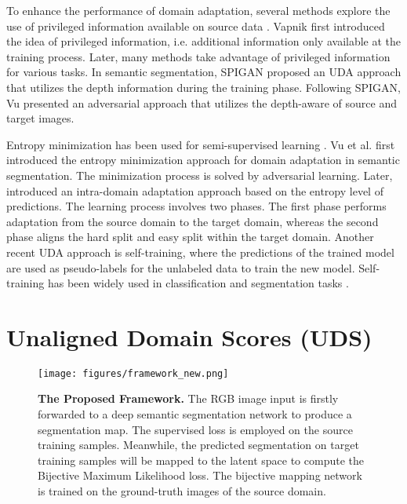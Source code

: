 \documentclass[10pt,twocolumn,letterpaper]{article}
\begin{document}
To enhance the performance of domain adaptation, several methods explore the use of privileged information available on source data \cite{chen2014recognizing, li2014exploiting, sarafianos2017adaptive}. Vapnik \etal \cite{vapnik2009new} first introduced the idea of privileged information, i.e. additional information only available at the training process. Later, many methods \cite{hoffman2016learning, lopez2015unifying, mordan2018revisiting, Sharmanska_2013_ICCV} take advantage of privileged information for various tasks. In semantic segmentation, SPIGAN \cite{lee2018spigan} proposed an UDA approach that utilizes the depth information during the training phase. Following SPIGAN,  Vu \etal\cite{vu2019dada} presented an adversarial approach that utilizes the depth-aware of source and target images.



Entropy minimization has been used for semi-supervised learning \cite{grandvalet2005semi, springenberg2015unsupervised}. Vu et al. \cite{vu2019advent} first introduced the entropy minimization approach for domain adaptation in semantic segmentation. The minimization process is solved by adversarial learning. Later, \cite{pan2020unsupervised} introduced an intra-domain adaptation approach based on the entropy level of predictions. The learning process involves two phases. The first phase performs adaptation from the source domain to the target domain, whereas the second phase aligns the hard split and easy split within the target domain.
Another recent UDA approach is self-training, where 
the predictions of the trained model are used as pseudo-labels for the unlabeled data to train the new model. Self-training has been widely used in classification \cite{NEURIPS2019_bf25356f}
and segmentation tasks \cite{zou2018unsupervised}. 




















\section{Unaligned Domain Scores (UDS)}





\begin{figure*}[!t]
    \centering
\texttt{[image: figures/framework\_new.png]}
    \caption{\textbf{The Proposed Framework.} The RGB image input is firstly forwarded to a deep semantic segmentation network to produce a segmentation map. The supervised loss is employed on the source training samples. Meanwhile, the predicted segmentation on target training samples will be mapped to the latent space to compute the Bijective Maximum Likelihood loss. The bijective mapping network is trained on the ground-truth images of the source domain.}
    \label{fig:proposed_framework}
\end{figure*}
\end{document}
